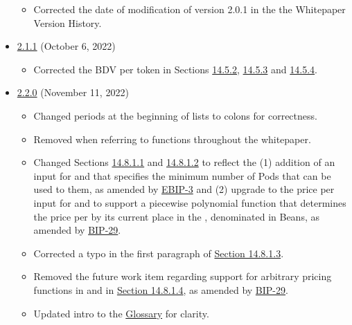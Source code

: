 \documentclass[class=article, crop=false]{standalone}
\begin{document}
\begin{itemize}[topsep=0pt, itemsep=3pt,leftmargin=16pt]
\begin{itemize}
        \item Corrected the date of modification of version 2.0.1 in the the Whitepaper Version History.
    \end{itemize}  
    \newpage
        \item \href{https://github.com/BeanstalkFarms/Beanstalk/blob/master/version-history/beanstalk2_1_1.pdf}{2.1.1} (October 6, 2022)
    \begin{itemize}
        \item Corrected the BDV per token in Sections \hyperlink{subsubsection.14.5.2}{14.5.2}, \hyperlink{subsubsection.14.5.3}{14.5.3} and \hyperlink{subsubsection.14.5.4}{14.5.4}.
    \end{itemize}
        \item \href{https://github.com/BeanstalkFarms/Beanstalk/blob/master/beanstalk.pdf}{2.2.0} (November 11, 2022)
    \begin{itemize}
        \item Changed periods at the beginning of lists to colons for correctness.
        \item Removed \code{()} when referring to functions throughout the whitepaper.
        \item Changed Sections \hyperlink{paragraph.14.8.1.1}{14.8.1.1} and \hyperlink{paragraph.14.8.1.2}{14.8.1.2} to reflect the (1) addition of an input for  and  that specifies the minimum number of Pods that can be used to  them, as amended by \href{https://github.com/BeanstalkFarms/Beanstalk-Governance-Proposals/blob/master/bip/ebip/ebip-3-pod-listing-cancellation.md}{EBIP-3} and (2) upgrade to the price per  input for  and  to support a piecewise polynomial function that determines the price per  by its current place in the , denominated in Beans, as amended by \href{https://github.com/BeanstalkFarms/Beanstalk-Governance-Proposals/blob/master/bip/bip-29-pod-market-price-functions.md}{BIP-29}.
        \item Corrected a typo in the first paragraph of \hyperlink{paragraph.14.8.1.3}{Section 14.8.1.3}.
        \item Removed the future work item regarding support for arbitrary pricing functions in  and  in \hyperlink{paragraph.14.8.1.4}{Section 14.8.1.4}, as amended by \href{https://github.com/BeanstalkFarms/Beanstalk-Governance-Proposals/blob/master/bip/bip-29-pod-market-price-functions.md}{BIP-29}.
        \item Updated intro to the \hyperlink{subsection.14.11}{Glossary} for clarity.

\end{itemize}
\end{itemize}
\end{document}
